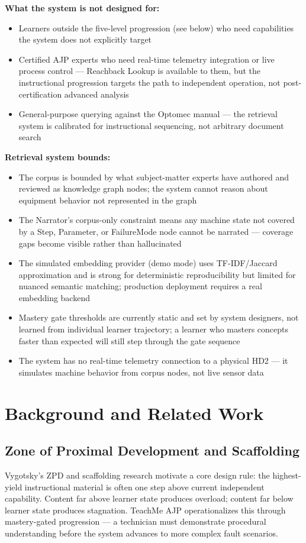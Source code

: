 \documentclass[10pt,letterpaper,twocolumn]{article}
\begin{document}
\textbf{What the system is not designed for:}
\begin{itemize}
  \item Learners outside the five-level progression (see below) who need capabilities the system does not explicitly target
  \item Certified AJP experts who need real-time telemetry integration or live process control --- Reachback Lookup is available to them, but the instructional progression targets the path to independent operation, not post-certification advanced analysis
  \item General-purpose querying against the Optomec manual --- the retrieval system is calibrated for instructional sequencing, not arbitrary document search
\end{itemize}

\textbf{Retrieval system bounds:}
\begin{itemize}
  \item The corpus is bounded by what subject-matter experts have authored and reviewed as knowledge graph nodes; the system cannot reason about equipment behavior not represented in the graph
  \item The Narrator's corpus-only constraint means any machine state not covered by a Step, Parameter, or FailureMode node cannot be narrated --- coverage gaps become visible rather than hallucinated
  \item The simulated embedding provider (demo mode) uses TF-IDF/Jaccard approximation and is strong for deterministic reproducibility but limited for nuanced semantic matching; production deployment requires a real embedding backend
  \item Mastery gate thresholds are currently static and set by system designers, not learned from individual learner trajectory; a learner who masters concepts faster than expected will still step through the gate sequence
  \item The system has no real-time telemetry connection to a physical HD2 --- it simulates machine behavior from corpus nodes, not live sensor data
\end{itemize}

\section{Background and Related Work}
\label{sec:background}

\subsection{Zone of Proximal Development and Scaffolding}
Vygotsky's ZPD and scaffolding research motivate a core design rule: the highest-yield instructional material is often one step above current independent capability. Content far above learner state produces overload; content far below learner state produces stagnation. TeachMe AJP operationalizes this through mastery-gated progression --- a technician must demonstrate procedural understanding before the system advances to more complex fault scenarios.
\end{document}
